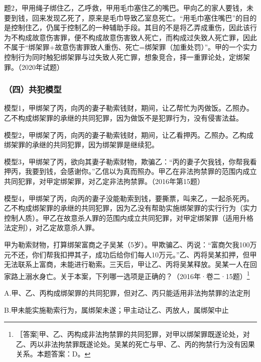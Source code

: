 题2，甲用绳子绑住乙，乙呼救，甲用毛巾塞住乙的嘴巴。甲向乙的家人要钱，未要到钱，回来发现乙死了，原来是毛巾导致乙室息死亡。“用毛巾塞住嘴巴”的目的是控制住乙，仍属于控制乙的一种辅助手段。其目的不是将乙弄成重伤，因此该行为不构成故意伤害罪，便不构成故意伤害致人死亡，而构成过失致人死亡罪，因此不属于“绑架罪+故意伤害罪致人重伤、死亡=绑架罪（加重处罚）”。甲的一个实力控制行为同时触犯绑架罪与过失致人死亡罪，想象竞合，择一重罪论处，定绑架罪。（2020年试题）



\subsubsection*{（四）共犯模型}

模型1，甲绑架了丙，向丙的妻子勒索钱财，期间，让乙帮忙为丙做饭。乙照办。乙不构成绑架罪的承继的共同犯罪，因为做饭不是犯罪行为，没有侵害法益。

模型2，甲绑架了丙，向丙的妻子勒索钱财，期间，让乙看押丙。乙照办。乙构成绑架罪的承继的共同犯罪，因为绑架罪是继续犯。

模型3，甲绑架了丙，欲向其妻子勒索财物，欺骗乙：“丙的妻子欠我钱，你帮我看押丙，我要到钱，会感谢你。”乙信以为真而照办。甲乙在非法拘禁罪的范围内成立共同犯罪，对甲定绑架罪，对乙定非法拘禁罪。（2016年第15题）

模型4，甲绑架了丙，向丙的妻子没能勒索到钱，要撕票，叫来乙，一起杀死丙。乙不构成绑架罪的承继的共同犯罪，因为乙没有帮助实施绑架罪的实行行为（实力控制人质）。甲乙在故意杀人罪的范围内成立共同犯罪，对甲定绑架罪（适用升格法定刑），对乙定故意杀人罪。


甲为勒索财物，打算绑架富商之子吴某（5岁）。甲欺骗乙、丙说：“富商欠我100万元不还，你们帮我扣押其子，成功后给你们每人10万元。”乙、丙将吴某扣押，但甲无法联系上富商，未能进行勒索。三天后，甲让乙、丙将吴某释放。吴某一人在回家路上溺水身亡。关于本案，下列哪一选项是正确的？（2016年·卷二·15题）\footnote{［答案]甲、乙、丙构成非法拘禁罪的共同犯罪，对甲以绑架罪既遂论处，对乙、丙以非法拘禁罪既遂论处。吴某的死亡与甲、乙、丙的拘禁行为没有因果关系。本题答案：D。}

A.甲、乙、丙构成绑架罪的共同犯罪，但对乙、丙只能适用非法拘禁罪的法定刑

B.甲未能实施勒索行为，属绑架未遂；甲主动让乙、丙放人，属绑架中止


